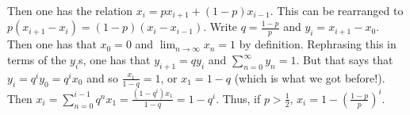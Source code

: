\documentclass[11pt]{article}
\theoremstyle{definition}
\begin{document}
Then one has the relation $x_i = px_{i+1} + (1-p)x_{i-1}$.  This can be rearranged to $p(x_{i+1}-x_i) = (1-p)(x_i-x_{i-1})$.  Write $q = \frac{1-p}{p}$ and $y_i = x_{i+1}-x_0$.  Then one has that $x_0 = 0$ and $\displaystyle{\lim_{n\rightarrow \infty}} x_n = 1$ by definition.  Rephrasing this in terms of the $y_i$s, one has that $y_{i+1} = q y_i$ and $\displaystyle{\sum_{n = 0}^{\infty}} y_n = 1$.  But that says that $y_i = q^i y_0 = q^i x_0$ and so $\frac{x_1}{1-q} = 1$, or $x_1 = 1-q$ (which is what we got before!).  Then $x_i = \displaystyle{\sum_{n = 0}^{i-1} q^n x_1 = \frac{(1-q^i)x_1}{1-q} = 1-q^i}$.  Thus, if $p > \frac{1}{2}$, $x_i = 1-\left(\frac{1-p}{p}\right)^i$.
\end{document}
